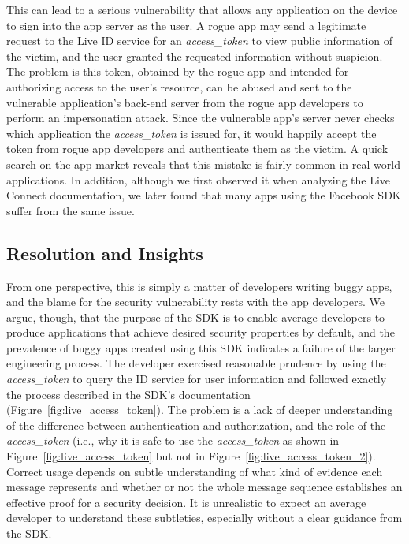 This can lead to a serious vulnerability that allows any application on the device to sign into the app server as the user. A rogue app may send a legitimate request to the Live ID service for an \emph{access\_token} to view public information of the victim, and the user granted the requested information without suspicion.  The problem is this token, obtained by the rogue app and intended for authorizing access to the user's resource, can be abused and sent to the vulnerable application's back-end server from the rogue app developers to perform an impersonation attack.  Since the vulnerable app's server never checks which application the \emph{access\_token} is issued for, it would happily accept the token from rogue app developers and authenticate them as the victim.  A quick search on the app market reveals that this mistake is fairly common in real world applications.  In addition, although we first observed it when analyzing the Live Connect documentation, we later found that many apps using the Facebook SDK suffer from the same issue.  

\subsection{Resolution and Insights}

From one perspective, this is simply a matter of developers writing buggy apps, and the blame for the security vulnerability rests with the app developers.  We argue, though, that the purpose of the SDK is to enable average developers to produce applications that achieve desired security properties by default, and the prevalence of buggy apps created using this SDK indicates a failure of the larger engineering process.  The developer exercised reasonable prudence by using the \emph{access\_token} to query the ID service for user information and followed exactly the process described in the SDK's documentation (Figure~\ref{fig:live_access_token}).  The problem is a lack of deeper understanding of the difference between authentication and authorization, and the role of the \emph{access\_token} (i.e., why it is safe to use the \emph{access\_token} as shown in Figure~\ref{fig:live_access_token} but not in Figure~\ref{fig:live_access_token_2}).  Correct usage depends on subtle understanding of what kind of evidence each message represents and whether or not the whole message sequence establishes an effective proof for a security decision.  It is unrealistic to expect an average developer to understand these subtleties, especially without a clear guidance from the SDK.

